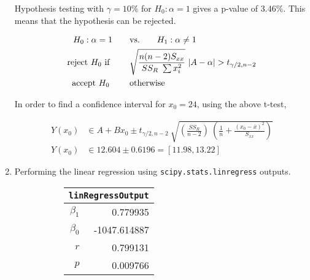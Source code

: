 \begin{enumerate}
Hypothesis testing with $ \gamma = 10\% $ for $ H_0 : \alpha = 1 $ gives a p-value of $ 3.46\% $. This means that the hypothesis can be rejected.

\begin{align}
	H_0 : \alpha = 1 \qquad &\text{vs.} \qquad H_1 : \alpha \neq 1 \nonumber \\
	\text{reject $ H_0 $ if } \qquad & \sqrt{\frac{n(n-2) S_{xx}}{SS_R\ \sum x_i^2}}\ |A - \alpha| > t_{\gamma/2, n-2} \nonumber \\
	\text{accept $ H_0 $  } \qquad & \text{otherwise}
\end{align}

In order to find a confidence interval for $ x_0 = 24 $, using the above t-test,

\begin{align}
	Y(x_0) &\in A + B x_0 \pm t_{\gamma/2, n-2}\ \sqrt{\left(\frac{SS_R}{n-2}\right)\ \left(\frac{1}{n} + \frac{(x_0  - \overline{x})^2}{S_{xx}}\right)} \nonumber \\
	Y(x_0) &\in 12.604 \pm 0.6196 = [11.98, 13.22]
\end{align}

\item Performing the linear regression using \texttt{scipy.stats.linregress} outputs.

\begin{figure}[H]
	\begin{subfigure}[]{0.2\linewidth}
		\centering
		\begin{tabular}{@{}rr@{}}
			\toprule
			\multicolumn{2}{c}{\texttt{linRegressOutput}} \\
			\midrule
			$\beta_1$     &         0.779935 \\
			$\beta_0$ &     -1047.614887 \\
			$r$    &         0.799131 \\
			$p$    &         0.009766 \\
			\bottomrule
		\end{tabular}
		
	\end{subfigure}
	\begin{subfigure}[]{0.8\linewidth}
		\centering
		
	\end{subfigure}
\end{figure}


\end{enumerate}
